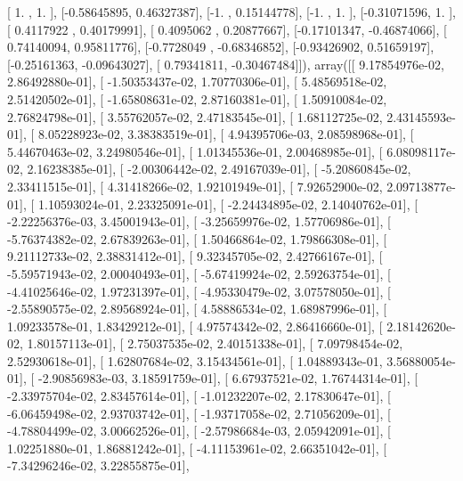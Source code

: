 \documentclass{article}
\begin{document}
       [ 1.        ,  1.        ],
       [-0.58645895,  0.46327387],
       [-1.        ,  0.15144778],
       [-1.        ,  1.        ],
       [-0.31071596,  1.        ],
       [ 0.4117922 ,  0.40179991],
       [ 0.4095062 ,  0.20877667],
       [-0.17101347, -0.46874066],
       [ 0.74140094,  0.95811776],
       [-0.7728049 , -0.68346852],
       [-0.93426902,  0.51659197],
       [-0.25161363, -0.09643027],
       [ 0.79341811, -0.30467484]]), array([[  9.17854976e-02,   2.86492880e-01],
       [ -1.50353437e-02,   1.70770306e-01],
       [  5.48569518e-02,   2.51420502e-01],
       [ -1.65808631e-02,   2.87160381e-01],
       [  1.50910084e-02,   2.76824798e-01],
       [  3.55762057e-02,   2.47183545e-01],
       [  1.68112725e-02,   2.43145593e-01],
       [  8.05228923e-02,   3.38383519e-01],
       [  4.94395706e-03,   2.08598968e-01],
       [  5.44670463e-02,   3.24980546e-01],
       [  1.01345536e-01,   2.00468985e-01],
       [  6.08098117e-02,   2.16238385e-01],
       [ -2.00306442e-02,   2.49167039e-01],
       [ -5.20860845e-02,   2.33411515e-01],
       [  4.31418266e-02,   1.92101949e-01],
       [  7.92652900e-02,   2.09713877e-01],
       [  1.10593024e-01,   2.23325091e-01],
       [ -2.24434895e-02,   2.14040762e-01],
       [ -2.22256376e-03,   3.45001943e-01],
       [ -3.25659976e-02,   1.57706986e-01],
       [ -5.76374382e-02,   2.67839263e-01],
       [  1.50466864e-02,   1.79866308e-01],
       [  9.21112733e-02,   2.38831412e-01],
       [  9.32345705e-02,   2.42766167e-01],
       [ -5.59571943e-02,   2.00040493e-01],
       [ -5.67419924e-02,   2.59263754e-01],
       [ -4.41025646e-02,   1.97231397e-01],
       [ -4.95330479e-02,   3.07578050e-01],
       [ -2.55890575e-02,   2.89568924e-01],
       [  4.58886534e-02,   1.68987996e-01],
       [  1.09233578e-01,   1.83429212e-01],
       [  4.97574342e-02,   2.86416660e-01],
       [  2.18142620e-02,   1.80157113e-01],
       [  2.75037535e-02,   2.40151338e-01],
       [  7.09798454e-02,   2.52930618e-01],
       [  1.62807684e-02,   3.15434561e-01],
       [  1.04889343e-01,   3.56880054e-01],
       [ -2.90856983e-03,   3.18591759e-01],
       [  6.67937521e-02,   1.76744314e-01],
       [ -2.33975704e-02,   2.83457614e-01],
       [ -1.01232207e-02,   2.17830647e-01],
       [ -6.06459498e-02,   2.93703742e-01],
       [ -1.93717058e-02,   2.71056209e-01],
       [ -4.78804499e-02,   3.00662526e-01],
       [ -2.57986684e-03,   2.05942091e-01],
       [  1.02251880e-01,   1.86881242e-01],
       [ -4.11153961e-02,   2.66351042e-01],
       [ -7.34296246e-02,   3.22855875e-01],
\end{document}
